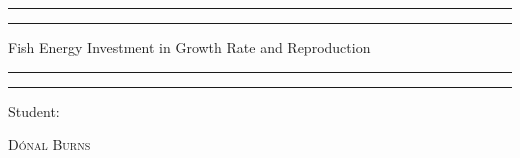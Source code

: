 
 

\begin{titlepage} %

	\centering %
	
	\scshape %
	
	\vspace*{\baselineskip} %
	
	
	\rule{\textwidth}{1.6pt}\vspace*{-\baselineskip}\vspace*{2pt} %
	\rule{\textwidth}{0.4pt} %
	
	\vspace{0.75\baselineskip} %
	
	{\LARGE Fish Energy Investment in Growth Rate and Reproduction\\} %
	
	\vspace{0.75\baselineskip} %
	
	\rule{\textwidth}{0.4pt}\vspace*{-\baselineskip}\vspace{3.2pt} %
	\rule{\textwidth}{1.6pt} %
	
	\vspace{2\baselineskip} %
	
	
		Student:
	
	
	\vspace{0.5\baselineskip} %
	
	{\scshape\Large D\'onal Burns  \\} %
	
	\vspace{0.5\baselineskip} %
	

\end{titlepage}
